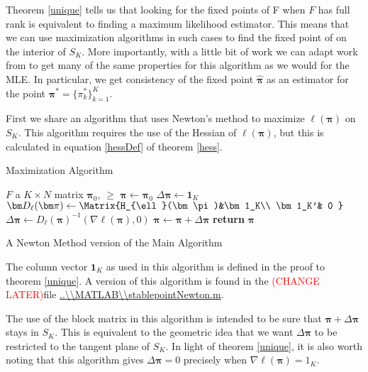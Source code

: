 Theorem \ref{unique} tells us that looking for the fixed points of \Rpi F when $F$ has full rank is equivalent to finding a maximum likelihood estimator. This means that we can use maximization algorithms in such cases to find the fixed point of  on the interior of $S_K$.  More importantly, with a little bit of work we can adapt work from \citep{WaldMLE, pollard1981, pollard1982} to get many of the same properties for this algorithm as we would for the MLE.  In particular, we get consistency of the fixed point $\hat{\bm\pi}$ as an estimator for the point $\bm\pi^\ast=\{\pi_k^\ast\}_{k=1}^{K}$.

First we share an algorithm that uses Newton's method to maximize $\ell(\bm\pi)$ on $S_K$. This algorithm requires the use of the Hessian of $\ell(\bm\pi)$, but this is calculated in equation \ref{hessDef} of theorem \ref{hess}.
\begin{table}
\begin{algorithm}[H]
\caption{Maximization Algorithm}
\begin{algorithmic}
\Require $F$ a $K\times N$ matrix
\Require $\bm\pi_0$, $\ge$
\Comment{}
	\State $\bm\pi \gets \bm\pi_0$
	\State $\Delta\bm\pi \gets \bm 1_K$
	\While{$\lVert\Delta\bm\pi\rVert>\ge\lVert\bm\pi\rVert$}
		\State $\bm D_{\ell}(\bm\pi) \gets \Matrix{H_{\ell}(\bm\pi)&\bm 1_K\\ \bm 1_K'& 0 }$
		\State $\Delta\bm\pi \gets D_{\ell}(\bm\pi)^{-1}(\nabla\ell(\bm\pi),0)$
		\State $\bm\pi \gets \bm\pi + \Delta\bm\pi$
	\EndWhile
	\State \textbf{return} $\bm\pi$ 
\EndProcedure
\end{algorithmic}
\end{algorithm}
\caption{A Newton Method version of the Main Algorithm}\label{newtAlg}
\end{table}
The column vector $\bm 1_K$ as used in this algorithm is defined in the proof to theorem \ref{unique}.  A version of this algorithm is found in the \textcolor{red}{(CHANGE LATER)}file \url{..\\MATLAB\\stablepointNewton.m}.

The use of the block matrix in this algorithm is intended to be sure that $\bm\pi+\Delta\bm\pi$ stays in $S_K$.  This is equivalent to the geometric idea that we want $\Delta\bm\pi$ to be restricted to the tangent plane of $S_K$.  In light of theorem \ref{unique}, it is also worth noting that this algorithm gives $\Delta\bm\pi=0$ precisely when $\nabla\ell(\bm\pi)=1_K$.

